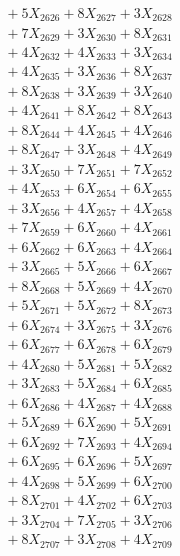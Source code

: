\documentclass[a4paper,10pt]{article}
\begin{document}
{\begin{align}
&\;  + 5 X_{2626} + 8 X_{2627} + 3 X_{2628} \\[0.3ex]
&\;  + 7 X_{2629} + 3 X_{2630} + 8 X_{2631} \\[0.3ex]
&\;  + 4 X_{2632} + 4 X_{2633} + 3 X_{2634} \\[0.3ex]
&\;  + 4 X_{2635} + 3 X_{2636} + 8 X_{2637} \\[0.3ex]
&\;  + 8 X_{2638} + 3 X_{2639} + 3 X_{2640} \\[0.3ex]
&\;  + 4 X_{2641} + 8 X_{2642} + 8 X_{2643} \\[0.3ex]
&\;  + 8 X_{2644} + 4 X_{2645} + 4 X_{2646} \\[0.3ex]
&\;  + 8 X_{2647} + 3 X_{2648} + 4 X_{2649} \\[0.5ex]\allowbreak
&\;  + 3 X_{2650} + 7 X_{2651} + 7 X_{2652} \\[0.3ex]
&\;  + 4 X_{2653} + 6 X_{2654} + 6 X_{2655} \\[0.3ex]
&\;  + 3 X_{2656} + 4 X_{2657} + 4 X_{2658} \\[0.3ex]
&\;  + 7 X_{2659} + 6 X_{2660} + 4 X_{2661} \\[0.3ex]
&\;  + 6 X_{2662} + 6 X_{2663} + 4 X_{2664} \\[0.3ex]
&\;  + 3 X_{2665} + 5 X_{2666} + 6 X_{2667} \\[0.3ex]
&\;  + 8 X_{2668} + 5 X_{2669} + 4 X_{2670} \\[0.3ex]
&\;  + 5 X_{2671} + 5 X_{2672} + 8 X_{2673} \\[0.3ex]
&\;  + 6 X_{2674} + 3 X_{2675} + 3 X_{2676} \\[0.3ex]
&\;  + 6 X_{2677} + 6 X_{2678} + 6 X_{2679} \\[0.5ex]\allowbreak
&\;  + 4 X_{2680} + 5 X_{2681} + 5 X_{2682} \\[0.3ex]
&\;  + 3 X_{2683} + 5 X_{2684} + 6 X_{2685} \\[0.3ex]
&\;  + 6 X_{2686} + 4 X_{2687} + 4 X_{2688} \\[0.3ex]
&\;  + 5 X_{2689} + 6 X_{2690} + 5 X_{2691} \\[0.3ex]
&\;  + 6 X_{2692} + 7 X_{2693} + 4 X_{2694} \\[0.3ex]
&\;  + 6 X_{2695} + 6 X_{2696} + 5 X_{2697} \\[0.3ex]
&\;  + 4 X_{2698} + 5 X_{2699} + 6 X_{2700} \\[0.3ex]
&\;  + 8 X_{2701} + 4 X_{2702} + 6 X_{2703} \\[0.3ex]
&\;  + 3 X_{2704} + 7 X_{2705} + 3 X_{2706} \\[0.3ex]
&\;  + 8 X_{2707} + 3 X_{2708} + 4 X_{2709} \\[0.5ex]\allowbreak

\end{align}}
\end{document}
